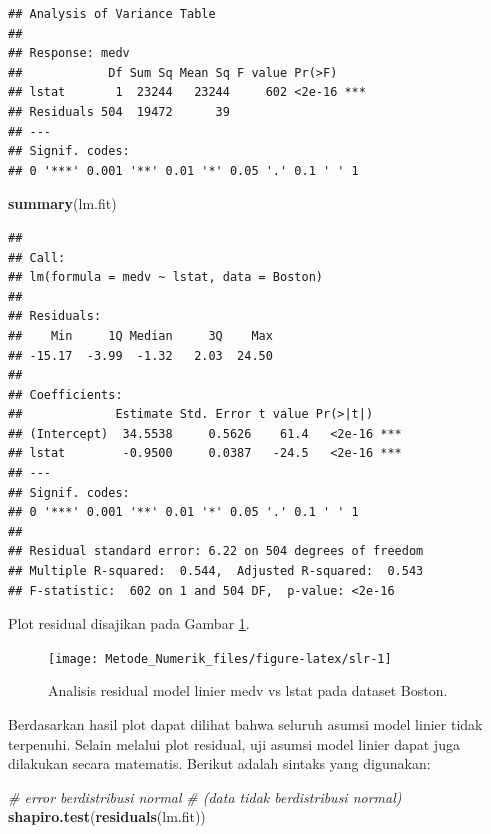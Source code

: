 \documentclass[
]{book}
\newenvironment{Shaded}{\begin{snugshade}}{\end{snugshade}}
\newcommand{\CommentTok}[1]{\textcolor[rgb]{0.56,0.35,0.01}{\textit{#1}}}
\newcommand{\FunctionTok}[1]{\textcolor[rgb]{0.13,0.29,0.53}{\textbf{#1}}}
\newcommand{\NormalTok}[1]{#1}
\theoremstyle{definition}
\theoremstyle{definition}
\theoremstyle{definition}
\theoremstyle{definition}
\theoremstyle{remark}
\begin{document}
\begin{verbatim}
## Analysis of Variance Table
## 
## Response: medv
##            Df Sum Sq Mean Sq F value Pr(>F)    
## lstat       1  23244   23244     602 <2e-16 ***
## Residuals 504  19472      39                   
## ---
## Signif. codes:  
## 0 '***' 0.001 '**' 0.01 '*' 0.05 '.' 0.1 ' ' 1
\end{verbatim}

\begin{Shaded}
\begin{Highlighting}[]
\FunctionTok{summary}\NormalTok{(lm.fit)}
\end{Highlighting}
\end{Shaded}

\begin{verbatim}
## 
## Call:
## lm(formula = medv ~ lstat, data = Boston)
## 
## Residuals:
##    Min     1Q Median     3Q    Max 
## -15.17  -3.99  -1.32   2.03  24.50 
## 
## Coefficients:
##             Estimate Std. Error t value Pr(>|t|)    
## (Intercept)  34.5538     0.5626    61.4   <2e-16 ***
## lstat        -0.9500     0.0387   -24.5   <2e-16 ***
## ---
## Signif. codes:  
## 0 '***' 0.001 '**' 0.01 '*' 0.05 '.' 0.1 ' ' 1
## 
## Residual standard error: 6.22 on 504 degrees of freedom
## Multiple R-squared:  0.544,  Adjusted R-squared:  0.543 
## F-statistic:  602 on 1 and 504 DF,  p-value: <2e-16
\end{verbatim}

Plot residual disajikan pada Gambar \ref{fig:slr}.

\begin{figure}

{\centering \texttt{[image: Metode\_Numerik\_files/figure-latex/slr-1]} 

}

\caption{Analisis residual model linier medv vs lstat pada dataset Boston.}\label{fig:slr}
\end{figure}

Berdasarkan hasil plot dapat dilihat bahwa seluruh asumsi model linier tidak terpenuhi. Selain melalui plot residual, uji asumsi model linier dapat juga dilakukan secara matematis. Berikut adalah sintaks yang digunakan:

\begin{Shaded}
\begin{Highlighting}[]
\CommentTok{\# error berdistribusi normal }
\CommentTok{\# (data tidak berdistribusi normal)}
\FunctionTok{shapiro.test}\NormalTok{(}\FunctionTok{residuals}\NormalTok{(lm.fit))}
\end{Highlighting}
\end{Shaded}
\end{document}
